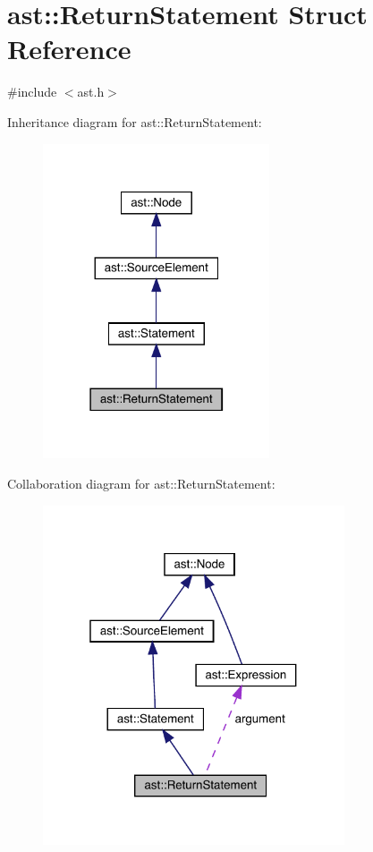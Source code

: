 \hypertarget{structast_1_1_return_statement}{}\section{ast\+:\+:Return\+Statement Struct Reference}
\label{structast_1_1_return_statement}


{\ttfamily \#include $<$ast.\+h$>$}



Inheritance diagram for ast\+:\+:Return\+Statement\+:
\nopagebreak
\begin{figure}[H]
\begin{center}
\leavevmode
\includegraphics[width=190pt]{structast_1_1_return_statement__inherit__graph}
\end{center}
\end{figure}


Collaboration diagram for ast\+:\+:Return\+Statement\+:
\nopagebreak
\begin{figure}[H]
\begin{center}
\leavevmode
\includegraphics[width=253pt]{structast_1_1_return_statement__coll__graph}
\end{center}
\end{figure}
